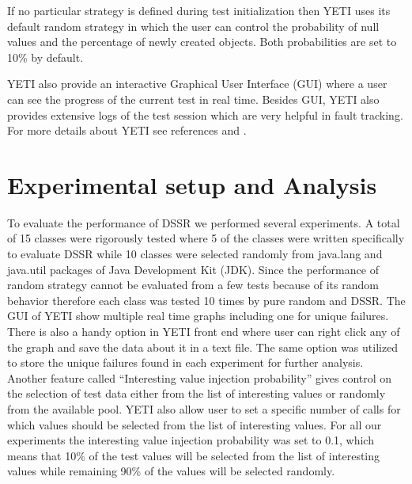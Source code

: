 \documentclass[10pt, conference, compsocconf]{IEEEtran}
\begin{document}
If no particular strategy is defined during test initialization then YETI uses its default random strategy in which the user can control the probability of null values and the percentage of newly created objects. Both probabilities are set to 10\% by default.

YETI also provide an interactive Graphical User Interface (GUI) where a user can see the progress of the current test in real time. Besides GUI, YETI also provides extensive logs of the test session which are very helpful in fault tracking. For more details about YETI see references \cite{Oriol2010a} and \cite{Oriol2010}.

\section{Experimental setup and Analysis}\label{sec:experimentalsetup}
To evaluate the performance of DSSR we performed several experiments. A total of 15 classes were rigorously tested where 5 of the classes were written specifically to evaluate DSSR while 10 classes were selected randomly from java.lang and java.util packages of Java Development Kit (JDK). Since the performance of random strategy cannot be evaluated from a few tests because of its random behavior therefore each class was tested 10 times by pure random and DSSR. The GUI of YETI show multiple real time graphs including one for unique failures. There is also a handy option in YETI front end where user can right click any of the graph and save the data about it in a text file. The same option was utilized to store the unique failures found in each experiment for further analysis. Another feature called ``Interesting value injection probability'' gives control on the selection of test data either from the list of interesting values or randomly from the available pool. YETI also allow user to set a specific number of calls for which values should be selected from the list of interesting values. For all our experiments the interesting value injection probability was set to 0.1, which means that 10\% of the test values will be selected from the list of interesting values while remaining 90\% of the values will be selected randomly.
\end{document}
